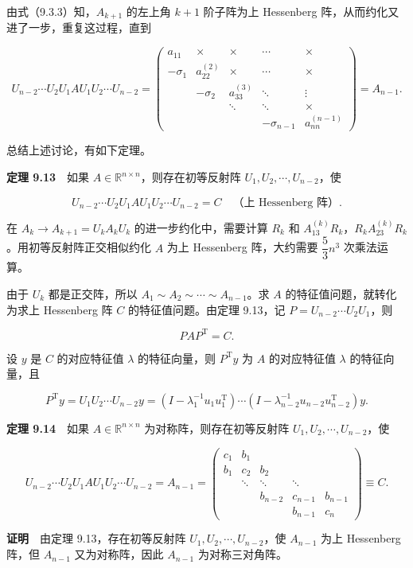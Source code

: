 \documentclass[
  10pt,
  fontset=fandol]{ctexart}
\begin{document}
由式（9.3.3）知，\(A_{k+1}\) 的左上角 \(k+1\) 阶子阵为上 Hessenberg 阵，从而约化又进了一步，重复这过程，直到

\[
U_{n-2}\cdots U_2U_1AU_1U_2\cdots U_{n-2}
=\begin{pmatrix}
a_{11}&\times&\times&\cdots&\times\\
-\sigma_1&a_{22}^{(2)}&\times&\cdots&\times\\
&-\sigma_2&a_{33}^{(3)}&\ddots&\vdots\\
&&\ddots&\ddots&\times\\
&&&-\sigma_{n-1}&a_{nn}^{(n-1)}
\end{pmatrix}=A_{n-1}.
\]

总结上述讨论，有如下定理。

\textbf{定理 9.13}　如果 \(A\in\mathbb R^{n\times n}\)，则存在初等反射阵 \(U_1,U_2,\cdots,U_{n-2}\)，使

\[
U_{n-2}\cdots U_2U_1AU_1U_2\cdots U_{n-2}=C\quad\text{（上 Hessenberg 阵）}.
\]

在 \(A_k\to A_{k+1}=U_kA_kU_k\) 的进一步约化中，需要计算 \(R_k\) 和 \(A_{13}^{(k)}R_k\)，\(R_kA_{23}^{(k)}R_k\)。用初等反射阵正交相似约化 \(A\) 为上 Hessenberg 阵，大约需要 \(\dfrac53n^3\) 次乘法运算。

由于 \(U_k\) 都是正交阵，所以 \(A_1\sim A_2\sim\cdots\sim A_{n-1}\)。求 \(A\) 的特征值问题，就转化为求上 Hessenberg 阵 \(C\) 的特征值问题。由定理 9.13，记 \(P=U_{n-2}\cdots U_2U_1\)，则

\[
PAP^{\mathrm T}=C.
\]

设 \(y\) 是 \(C\) 的对应特征值 \(\lambda\) 的特征向量，则 \(P^{\mathrm T}y\) 为 \(A\) 的对应特征值 \(\lambda\) 的特征向量，且

\[
P^{\mathrm T}y=U_1U_2\cdots U_{n-2}y
=(I-\lambda_1^{-1}u_1u_1^{\mathrm T})\cdots(I-\lambda_{n-2}^{-1}u_{n-2}u_{n-2}^{\mathrm T})y.
\]

\textbf{定理 9.14}　如果 \(A\in\mathbb R^{n\times n}\) 为对称阵，则存在初等反射阵 \(U_1,U_2,\cdots,U_{n-2}\)，使

\[
U_{n-2}\cdots U_2U_1AU_1U_2\cdots U_{n-2}=A_{n-1}
=\begin{pmatrix}
c_1&b_1&&&\\
b_1&c_2&b_2&&\\
&\ddots&\ddots&\ddots&\\
&&b_{n-2}&c_{n-1}&b_{n-1}\\
&&&b_{n-1}&c_n
\end{pmatrix}\equiv C.
\]

\textbf{证明}　由定理 9.13，存在初等反射阵 \(U_1,U_2,\cdots,U_{n-2}\)，使 \(A_{n-1}\) 为上 Hessenberg 阵，但 \(A_{n-1}\) 又为对称阵，因此 \(A_{n-1}\) 为对称三对角阵。
\end{document}
